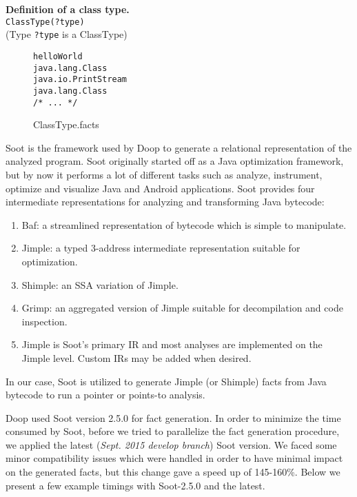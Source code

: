 \documentclass{dithesis}
\begin{document}
        \textbf{Definition of a class type.}\\
        \texttt{ClassType(?type)}\\
        (Type \texttt{?type} is a ClassType)
        \begin{figure}[H]
\begin{lstlisting}
helloWorld
java.lang.Class
java.io.PrintStream
java.lang.Class
/* ... */
\end{lstlisting}
\caption{ClassType.facts}
        \end{figure}


    Soot \cite{Sable: Soot} is the framework used by Doop to generate a relational representation of the analyzed program. Soot originally started off as a Java optimization framework, but by now it performs a lot of different tasks such as analyze, instrument, optimize and visualize Java and Android applications. Soot provides four intermediate representations for analyzing and transforming Java bytecode:
	\begin{enumerate}
		\item Baf: a streamlined representation of bytecode which is simple to manipulate.
		\item Jimple: a typed 3-address intermediate representation suitable for optimization.
		\item Shimple: an SSA variation of Jimple.
		\item Grimp: an aggregated version of Jimple suitable for decompilation and code inspection.
		\item Jimple is Soot’s primary IR and most analyses are implemented on the Jimple level. Custom IRs may be added when desired.
	\end{enumerate}
    In our case, Soot is utilized to generate Jimple (or Shimple) facts from Java bytecode to run a pointer or points-to analysis.
    

    	Doop used Soot version 2.5.0 for fact generation. In order to minimize the time consumed by Soot, before we tried to parallelize the fact generation procedure, we applied the latest (\textit{Sept. 2015 develop branch}) Soot version. We faced some minor compatibility issues which were handled in order to have minimal impact on the generated facts, but this change gave a speed up of 145-160\%. Below we present a few example timings with Soot-2.5.0 and the latest.
\end{document}
